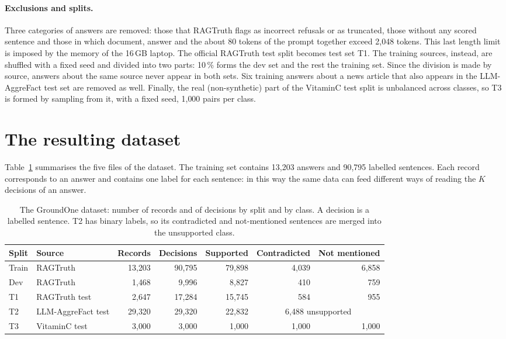 \paragraph{Exclusions and splits.} Three categories of answers are removed: those that RAGTruth flags as incorrect
refusals or as truncated, those without any scored sentence and those in which document, answer and the about 80 tokens of the prompt together exceed 2{,}048 tokens. This last length limit is imposed by the memory of the 16\,GB laptop. The official RAGTruth test split
becomes test set T1. The training sources, instead, are shuffled with a fixed seed and divided into two parts: 10\,\%
forms the dev set and the rest the training set. Since the division is made by source, answers about the same source
never appear in both sets. Six training answers about a news article that also appears in the LLM-AggreFact test set
are removed as well. Finally, the real (non-synthetic) part of the VitaminC test split is unbalanced across classes,
so T3 is formed by sampling from it, with a fixed seed, 1{,}000 pairs per class.

\section{The resulting dataset}
\label{sec:data-result}

Table~\ref{tab:data-splits} summarises the five files of the dataset. The training set contains 13{,}203 answers and
90{,}795 labelled sentences. Each record corresponds to an answer and contains one label for each sentence: in this
way the same data can feed different ways of reading the $K$ decisions of an answer.

\begin{table}[htbp]
\centering
\caption{The GroundOne dataset: number of records and of decisions by split and by class. A decision is a labelled
sentence. T2 has binary labels, so its contradicted and not-mentioned sentences are merged into the unsupported
class.}
\label{tab:data-splits}
\small
\begin{adjustbox}{max width=\textwidth}
\begin{tabular}{@{}llrrrrr@{}}
\toprule
Split & Source & Records & Decisions & Supported & Contradicted & Not mentioned \\
\midrule
Train & RAGTruth & 13{,}203 & 90{,}795 & 79{,}898 & 4{,}039 & 6{,}858 \\
Dev & RAGTruth & 1{,}468 & 9{,}996 & 8{,}827 & 410 & 759 \\
T1 & RAGTruth test & 2{,}647 & 17{,}284 & 15{,}745 & 584 & 955 \\
T2 & LLM-AggreFact test & 29{,}320 & 29{,}320 & 22{,}832 & \multicolumn{2}{c}{6{,}488 unsupported} \\
T3 & VitaminC test & 3{,}000 & 3{,}000 & 1{,}000 & 1{,}000 & 1{,}000 \\
\bottomrule
\end{tabular}
\end{adjustbox}
\end{table}

